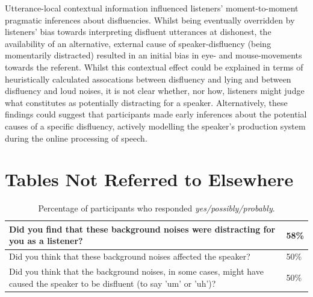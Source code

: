 \documentclass[a4paper,man,natbib]{apa6}
\begin{document}
% 

Utterance-local contextual information influenced listeners' moment-to-moment pragmatic inferences about disfluencies. 
Whilst being eventually overridden by listeners' bias towards interpreting disfluent utterances at dishonest, the availability of an alternative, external cause of speaker-disfluency (being momentarily distracted) resulted in an initial bias in eye- and mouse-movements towards the referent. 
Whilst this contextual effect could be explained in terms of heuristically calculated assocations between disfluency and lying and between disfluency and loud noises, it is not clear whether, nor how, listeners might judge what constitutes as potentially distracting for a speaker.
Alternatively, these findings could suggest that participants made early inferences about the potential causes of a specific disfluency, actively modelling the speaker's production system during the online processing of speech.



%


\appendix
\section{Tables Not Referred to Elsewhere}



\begin{table}[ht]
\centering
\begin{tabularx}{\linewidth}{|X|X|}
	\hline
Did you find that these background noises were distracting for you as a listener? & 58\%\\ 
   \hline
Did you think that these background noises affected the speaker? & 50\%\\
   \hline
Did you think that the background noises, in some cases, might have caused the speaker to be disfluent (to say 'um' or 'uh')? & 50\%\\
   \hline
\end{tabularx}
\caption{Percentage of participants who responded \textit{yes/possibly/probably}.}
\label{table:questions}
\end{table}
\end{document}
